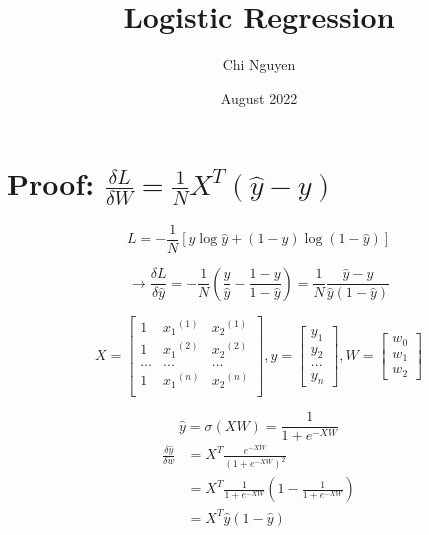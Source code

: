\documentclass[12pt,letterpaper]{article}
\title{Logistic Regression}
\author{Chi Nguyen}
\date{August 2022}
\begin{document}
\maketitle
\section{Proof: \(\frac{\delta L}{\delta W} = \frac{1}{N}X^T(\hat{y}-y)\)}
    \[L = -\frac{1}{N}[y\log\hat{y}+(1-y)\log(1-\hat{y})]\]
    
    \begin{equation*}
        \rightarrow
        \frac{\delta L}{\delta \hat{y}} = -\frac{1}{N}(\frac{y}{\hat{y}}-\frac{1-y}{1-\hat{y}})
                                          = \frac{1}{N}\frac{\hat{y}-y}{\hat{y}(1-\hat{y})}
    \end{equation*}

    $$X = \begin{bmatrix}
        1 & x{_1}^{(1)} & x{_2}^{(1)}\\
        1 & x{_1}^{(2)} & x{_2}^{(2)}\\
        ... & ... & ...\\
        1 & x{_1}^{(n)} & x{_2}^{(n)}\\
        \end{bmatrix},
    y = \begin{bmatrix}
            y_1\\
            y_2\\
            ...\\
            y_n
          \end{bmatrix},
    W = \begin{bmatrix}
            w_0\\
            w_1\\
            w_2
          \end{bmatrix}$$
    
    $$\hat{y} = \sigma(XW) = \frac{1}{1 + e^{-XW}}$$
    \begin{equation*}
        \begin{split}
        \frac{\delta \hat{y}}{\delta w} &= X^{T} \frac{e^{-XW}}{(1 + e^{-XW})^2}\\
                                        &= X^{T} \frac{1}{1 + e^{-XW}} (1 - \frac{1}{1 + e^{-XW}})\\
                                        &= X^{T} \hat{y}(1 - \hat{y})
        \end{split}
    \end{equation*}
    
\end{document}
